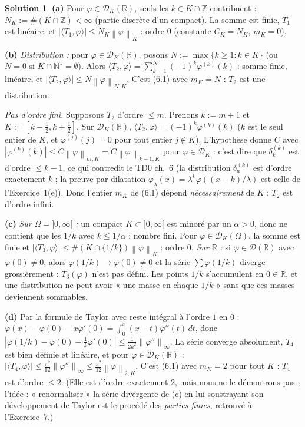 \documentclass[11pt,a4paper]{article}
\newcommand{\R}{\mathbb{R}}
\newcommand{\N}{\mathbb{N}}
\newcommand{\Z}{\mathbb{Z}}
\newcommand{\norm}[1]{\left\|#1\right\|}
\newcommand{\D}{\mathcal{D}}
\theoremstyle{definition}
\newtheorem*{solution}{Solution}
\begin{document}
\begin{solution}
\noindent\textbf{(a)} Pour $\varphi\in\D_K(\R)$, seuls les $k\in K\cap\Z$ contribuent : $N_K:=\#(K\cap\Z)<\infty$ (partie discrète d'un compact). La somme est finie, $T_1$ est linéaire, et $|\langle T_1,\varphi\rangle|\le N_K\norm\varphi_K$ : ordre $0$ (constante $C_K=N_K$, $m_K=0$).

\medskip
\noindent\textbf{(b)} \emph{Distribution :} pour $\varphi\in\D_K(\R)$, posons $N:=\max\{k\ge1:k\in K\}$ (ou $N=0$ si $K\cap\N^\star=\emptyset$). Alors $\langle T_2,\varphi\rangle=\sum_{k=1}^N(-1)^k\varphi^{(k)}(k)$ : somme finie, linéaire, et $|\langle T_2,\varphi\rangle|\le N\norm\varphi_{N,K}$. C'est (6.1) avec $m_K=N$ : $T_2$ est une distribution.

\emph{Pas d'ordre fini.} Supposons $T_2$ d'ordre $\le m$. Prenons $k:=m+1$ et $K:=[k-\frac12,k+\frac12]$. Sur $\D_K(\R)$, $\langle T_2,\varphi\rangle=(-1)^k\varphi^{(k)}(k)$ ($k$ est le seul entier de $K$, et $\varphi^{(j)}(j)=0$ pour tout entier $j\notin K$). L'hypothèse donne $C$ avec $|\varphi^{(k)}(k)|\le C\norm\varphi_{m,K}=C\norm\varphi_{k-1,K}$ pour $\varphi\in\D_K$ : c'est dire que $\delta_k^{(k)}$ est d'ordre $\le k-1$, ce qui contredit le TD0 ch.~6 (la distribution $\delta_a^{(k)}$ est d'ordre exactement $k$ ; la preuve par dilatation $\varphi_\lambda(x)=\lambda^k\varphi((x-k)/\lambda)$ est celle de l'Exercice~1(e)). Donc l'entier $m_K$ de (6.1) dépend \emph{nécessairement} de $K$ : $T_2$ est d'ordre infini.

\medskip
\noindent\textbf{(c)} \emph{Sur $\Omega=]0,\infty[$ :} un compact $K\subset]0,\infty[$ est minoré par un $\alpha>0$, donc ne contient que les $1/k$ avec $k\le1/\alpha$ : nombre fini. Pour $\varphi\in\D_K(\Omega)$, la somme est finie et $|\langle T_3,\varphi\rangle|\le\#(K\cap\{1/k\})\norm\varphi_K$ : ordre $0$. \emph{Sur $\R$ :} si $\varphi\in\D(\R)$ avec $\varphi(0)\ne0$, alors $\varphi(1/k)\to\varphi(0)\ne0$ et la série $\sum\varphi(1/k)$ diverge grossièrement : $T_3(\varphi)$ n'est pas défini. Les points $1/k$ s'accumulent en $0\in\R$, et une distribution ne peut avoir « une masse en chaque $1/k$ » sans que ces masses deviennent sommables.

\medskip
\noindent\textbf{(d)} Par la formule de Taylor avec reste intégral à l'ordre $1$ en $0$ : $\varphi(x)-\varphi(0)-x\varphi'(0)=\int_0^x(x-t)\varphi''(t)\,dt$, donc $|\varphi(1/k)-\varphi(0)-\tfrac1k\varphi'(0)|\le\frac1{2k^2}\norm{\varphi''}_\infty$. La série converge absolument, $T_4$ est bien définie et linéaire, et pour $\varphi\in\D_K(\R)$ : $|\langle T_4,\varphi\rangle|\le\frac{\pi^2}{12}\norm{\varphi''}_\infty\le\frac{\pi^2}{12}\norm\varphi_{2,K}$. C'est (6.1) avec $m_K=2$ pour tout $K$ : $T_4$ est d'ordre $\le2$. (Elle est d'ordre exactement $2$, mais nous ne le démontrons pas ; l'idée : « renormaliser » la série divergente de (c) en lui soustrayant son développement de Taylor est le procédé des \emph{parties finies}, retrouvé à l'Exercice~7.)
\end{solution}
\end{document}
